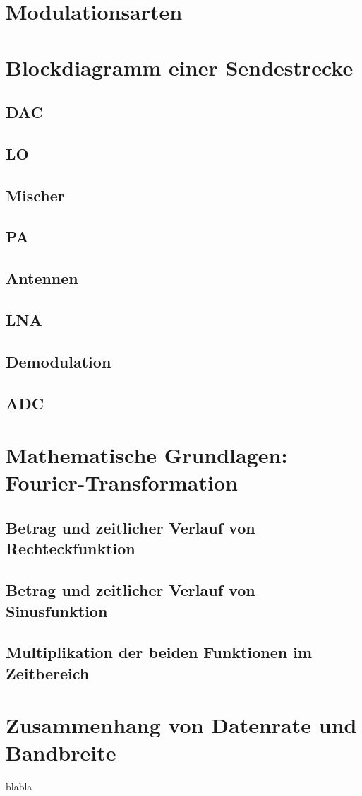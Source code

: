 \section{Modulationsarten}

\section{Blockdiagramm einer Sendestrecke}
\subsection{DAC}
\subsection{LO}
\subsection{Mischer} 
\subsection{PA}
\subsection{Antennen}
\subsection{LNA}
\subsection{Demodulation}
\subsection{ADC}


\section{Mathematische Grundlagen: Fourier-Transformation}
\subsection{Betrag und zeitlicher Verlauf von Rechteckfunktion}
\subsection{Betrag und zeitlicher Verlauf von Sinusfunktion}
\subsection{Multiplikation der beiden Funktionen im Zeitbereich}


\section{Zusammenhang von Datenrate und Bandbreite}
blabla
\clearpage